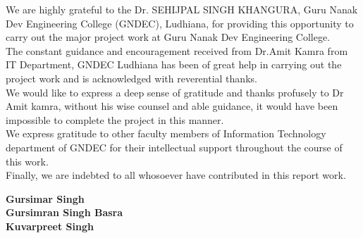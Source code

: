 \label{•} \begin{Large}
\end{Large}
\vskip 0.1in %



\noindent We are highly grateful to the Dr. SEHIJPAL SINGH KHANGURA, Guru Nanak Dev Engineering College (GNDEC), Ludhiana, for providing this opportunity to carry out the major project work at Guru Nanak Dev Engineering College.\\

\noindent The constant guidance and encouragement received from Dr.Amit Kamra from IT Department, GNDEC Ludhiana has been of great help in carrying out the project work and is acknowledged with reverential thanks.\\

\noindent We would like to express a deep sense of gratitude and thanks profusely to Dr Amit kamra, without his wise counsel and able guidance, it would have been impossible to complete the project in this manner.\\

\noindent We express gratitude to other faculty members of Information Technology department of GNDEC for their intellectual support throughout the course of this work.\\

\noindent Finally, we are indebted to all whosoever have contributed in this report work.



\vskip 0.4in
\noindent 
\textbf{Gursimar Singh}\\
\textbf{Gursimran Singh Basra}\\
\textbf{Kuvarpreet Singh}

